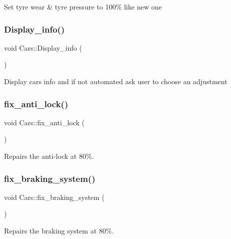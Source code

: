 Set tyre wear \& tyre pressure to 100\% like new one \mbox{\label{class_cars_a970d82288b7511be3afed4ed8f72160c}} 
\subsubsection{\texorpdfstring{Display\+\_\+info()}{Display\_info()}}
{\footnotesize\ttfamily void Cars\+::\+Display\+\_\+info (\begin{DoxyParamCaption}{ }\end{DoxyParamCaption})}

Display car\textquotesingle{}s info and if not automated ask user to choose an adjustment \mbox{\label{class_cars_a5854a8bdc81e465b20a20c0f7a5f1e58}} 
\subsubsection{\texorpdfstring{fix\+\_\+anti\+\_\+lock()}{fix\_anti\_lock()}}
{\footnotesize\ttfamily void Cars\+::fix\+\_\+anti\+\_\+lock (\begin{DoxyParamCaption}{ }\end{DoxyParamCaption})}

Repairs the anti-\/lock at 80\%. \mbox{\label{class_cars_ad28e5a3597b09c98f65111079b0d1032}} 
\subsubsection{\texorpdfstring{fix\+\_\+braking\+\_\+system()}{fix\_braking\_system()}}
{\footnotesize\ttfamily void Cars\+::fix\+\_\+braking\+\_\+system (\begin{DoxyParamCaption}{ }\end{DoxyParamCaption})}

Repairs the braking system at 80\%. \mbox{\label{class_cars_a63e3cb5337f7d5f30344cd4a5c3459cf}} 
